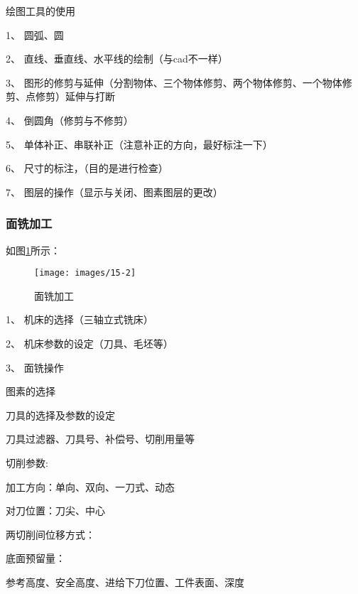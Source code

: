 绘图工具的使用

1、	圆弧、圆\par
2、	直线、垂直线、水平线的绘制（与cad不一样）\par
3、	图形的修剪与延伸（分割物体、三个物体修剪、两个物体修剪、一个物体修剪、点修剪）延伸与打断\par
4、	倒圆角（修剪与不修剪）\par
5、	单体补正、串联补正（注意补正的方向，最好标注一下）\par
6、	尺寸的标注，（目的是进行检查）\par
7、	图层的操作（显示与关闭、图素图层的更改）\par
\subsubsection{面铣加工}
如图\ref{面铣加工}所示：
\begin{figure}[!hbtp]
	\centering	\texttt{[image: images/15-2]}
	\caption{面铣加工} \label{面铣加工}
\end{figure}

1、	机床的选择（三轴立式铣床）\par
2、	机床参数的设定（刀具、毛坯等）\par
3、	面铣操作\par
图素的选择\par
刀具的选择及参数的设定\par
刀具过滤器、刀具号、补偿号、切削用量等\par
切削参数:\par
加工方向：单向、双向、一刀式、动态\par
对刀位置：刀尖、中心\par
两切削间位移方式：\par
底面预留量：\par
参考高度、安全高度、进给下刀位置、工件表面、深度\par
